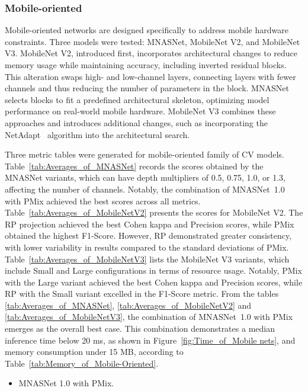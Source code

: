 




\FloatBarrier

\subsubsection{Mobile-oriented}

Mobile-oriented networks are designed specifically to address mobile hardware constraints. Three models were tested: MNASNet, MobileNet V2, and MobileNet V3. MobileNet V2, introduced first, incorporates architectural changes to reduce memory usage while maintaining accuracy, including inverted residual blocks. This alteration swaps high- and low-channel layers, connecting layers with fewer channels and thus reducing the number of parameters in the block. MNASNet selects blocks to fit a predefined architectural skeleton, optimizing model performance on real-world mobile hardware. MobileNet V3 combines these approaches and introduces additional changes, such as incorporating the NetAdapt~\cite{NetAdapt} algorithm into the architectural search.


Three metric tables were generated for mobile-oriented family of \gls{CV} models.
Table~\ref{tab:Averages_of_MNASNet} records the scores obtained by the MNASNet variants, which can have depth multipliers of 0.5, 0.75, 1.0, or 1.3, affecting the number of channels. Notably, the combination of \mbox{MNASNet 1.0} with \gls{PMix} achieved the best scores across all metrics.
Table~\ref{tab:Averages_of_MobileNetV2} presents the scores for MobileNet V2. The \gls{RP} projection achieved the best Cohen kappa and Precision scores, while \gls{PMix} obtained the highest F1-Score. However, \gls{RP} demonstrated greater consistency, with lower variability in results compared to the standard deviations of \gls{PMix}.
Table~\ref{tab:Averages_of_MobileNetV3} lists the MobileNet V3 variants, which include Small and Large configurations in terms of resource usage. Notably, \gls{PMix} with the Large variant achieved the best Cohen kappa and Precision scores, while \gls{RP} with the Small variant excelled in the F1-Score metric.
From the tables \ref{tab:Averages_of_MNASNet}, \ref{tab:Averages_of_MobileNetV2} and \ref{tab:Averages_of_MobileNetV3}, the combination of \mbox{MNASNet 1.0} with \gls{PMix} emerges as the overall best case. This combination demonstrates a median inference time below 20 ms, as shown in Figure~\ref{fig:Time_of_Mobile nets}, and memory consumption under 15 MB, according to Table~\ref{tab:Memory_of_Mobile-Oriented}.  
\begin{itemize}
	\item MNASNet 1.0 with \gls{PMix}.
\end{itemize}

